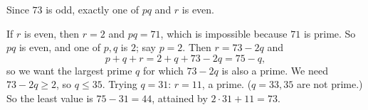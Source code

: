 Since $73$ is odd, exactly one of $pq$ and $r$ is even.

If $r$ is even, then $r=2$ and $pq=71$, which is impossible because $71$ is prime. So $pq$ is even, and one of $p,q$ is $2$; say $p=2$. Then $r=73-2q$ and
\[
p+q+r=2+q+73-2q=75-q,
\]
so we want the largest prime $q$ for which $73-2q$ is also a prime. We need $73-2q\ge2$, so $q\le35$. Trying $q=31$: $r=11$, a prime. ($q=33,35$ are not prime.) So the least value is $75-31=\boxed{44}$, attained by $2\cdot31+11=73$.
